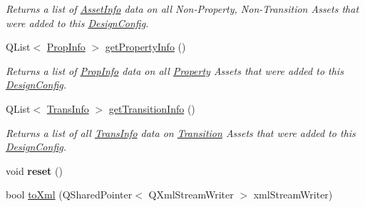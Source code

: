 \begin{DoxyCompactItemize}
\begin{DoxyCompactList}\small\item\em Returns a list of \hyperlink{struct_picto_1_1_asset_info}{Asset\-Info} data on all Non-\/\-Property, Non-\/\-Transition Assets that were added to this \hyperlink{class_picto_1_1_design_config}{Design\-Config}. \end{DoxyCompactList}\item 
\hypertarget{class_picto_1_1_design_config_ae31cdf8cd7bfd29cb9810dd6b9b737e6}{Q\-List$<$ \hyperlink{struct_picto_1_1_prop_info}{Prop\-Info} $>$ \hyperlink{class_picto_1_1_design_config_ae31cdf8cd7bfd29cb9810dd6b9b737e6}{get\-Property\-Info} ()}\label{class_picto_1_1_design_config_ae31cdf8cd7bfd29cb9810dd6b9b737e6}

\begin{DoxyCompactList}\small\item\em Returns a list of \hyperlink{struct_picto_1_1_prop_info}{Prop\-Info} data on all \hyperlink{class_picto_1_1_property}{Property} Assets that were added to this \hyperlink{class_picto_1_1_design_config}{Design\-Config}. \end{DoxyCompactList}\item 
\hypertarget{class_picto_1_1_design_config_aee932e628f49c3210bb97334f73f78be}{Q\-List$<$ \hyperlink{struct_picto_1_1_trans_info}{Trans\-Info} $>$ \hyperlink{class_picto_1_1_design_config_aee932e628f49c3210bb97334f73f78be}{get\-Transition\-Info} ()}\label{class_picto_1_1_design_config_aee932e628f49c3210bb97334f73f78be}

\begin{DoxyCompactList}\small\item\em Returns a list of all \hyperlink{struct_picto_1_1_trans_info}{Trans\-Info} data on \hyperlink{class_picto_1_1_transition}{Transition} Assets that were added to this \hyperlink{class_picto_1_1_design_config}{Design\-Config}. \end{DoxyCompactList}\item 
\hypertarget{class_picto_1_1_design_config_a306fa01ad2422272abf3d80ab8a95d26}{void {\bfseries reset} ()}\label{class_picto_1_1_design_config_a306fa01ad2422272abf3d80ab8a95d26}

\item 
\hypertarget{class_picto_1_1_design_config_a960ba37b69fa2b1ea847c736f33a71de}{bool \hyperlink{class_picto_1_1_design_config_a960ba37b69fa2b1ea847c736f33a71de}{to\-Xml} (Q\-Shared\-Pointer$<$ Q\-Xml\-Stream\-Writer $>$ xml\-Stream\-Writer)}\label{class_picto_1_1_design_config_a960ba37b69fa2b1ea847c736f33a71de}


\end{DoxyCompactItemize}
